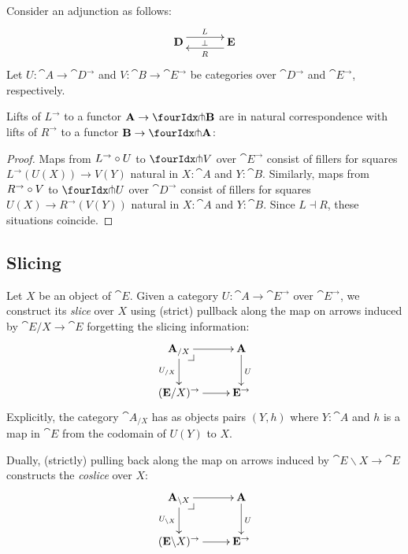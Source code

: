 \documentclass[reqno,10pt,a4paper,oneside]{amsart}
\begin{document}
Consider an adjunction as follows:
\[
\xymatrix@C+1em{
  \cat{D}
  \ar@<5pt>[r]^{L}
  \ar@{}[r]|{\bot}
&
  \cat{E}
  \ar@<5pt>[l]^{R}
}
\]
Let $U : \cat{A} \to \cat{D}^{\to}$ and $V : \cat{B} \to \cat{E}^{\to}$ be categories over $\cat{D}^{\to}$ and $\cat{E}^{\to}$, respectively.

\begin{lemma}
\label{lift-of-adjunction}
Lifts of $L^{\to}$ to a functor $\cat{A} \to \liftl{\cat{B}}$ are in natural correspondence with lifts of $R^{\to}$ to a functor $\cat{B} \to \liftr{\cat{A}}$:
\end{lemma}

\begin{proof}
Maps from $L^{\to} \mathbin{\circ} U$ to $\liftl{V}$ over $\cat{E}^{\to}$ consist of fillers for squares $L^{\to}(U(X)) \to V(Y)$ natural in $X : \cat{A}$ and $Y : \cat{B}$.
Similarly, maps from $R^{\to} \mathbin{\circ} V$ to $\liftr{U}$ over $\cat{D}^{\to}$ consist of fillers for squares $U(X) \to R^{\to}(V(Y))$ natural in $X : \cat{A}$ and $Y : \cat{B}$.
Since $L \dashv R$, these situations coincide.
\end{proof}

\subsection{Slicing}

Let $X$ be an object of $\cat{E}$.
Given a category $U : \cat{A} \to \cat{E}^{\to}$ over $\cat{E}^{\to}$, we construct its \emph{slice} over $X$ using (strict) pullback along the map on arrows induced by $\cat{E}/X \to \cat{E}$ forgetting the slicing information:
\[
\xymatrix{
  \cat{A}_{/X}
  \ar[r]
  \ar[d]_{U_{/X}}
  \pullback{dr}
&
  \cat{A}
  \ar[d]^{U}
\\
  (\cat{E}/X)^{\to}
  \ar[r]
&
  \cat{E}^{\to}
}
\]
Explicitly, the category $\cat{A}_{/X}$ has as objects pairs $(Y, h)$ where $Y : \cat{A}$ and $h$ is a map in $\cat{E}$ from the codomain of $U(Y)$ to $X$.

Dually, (strictly) pulling back along the map on arrows induced by $\cat{E} \backslash X \to \cat{E}$ constructs the \emph{coslice} over $X$:
\[
\xymatrix{
  \cat{A}_{\backslash X}
  \ar[r]
  \ar[d]_{U_{\backslash X}}
  \pullback{dr}
&
  \cat{A}
  \ar[d]^{U}
\\
  (\cat{E} \backslash X)^{\to}
  \ar[r]
&
  \cat{E}^{\to}
}
\]
\end{document}

